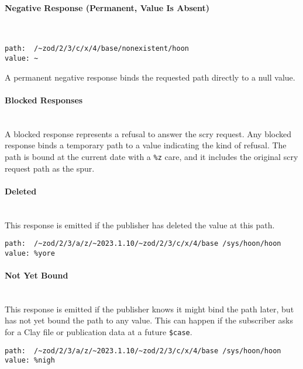 \documentclass[twoside]{article}
\begin{document}
\paragraph{Negative Response (Permanent, Value Is Absent)} \mbox{}\\

\begin{lstlisting}[style=listingcode]
path:  /~zod/2/3/c/x/4/base/nonexistent/hoon
value: ~
\end{lstlisting}

A permanent negative response binds the requested path directly to a null value.

\paragraph{Blocked Responses} \mbox{}\\

A blocked response represents a refusal to answer the scry request. Any blocked response binds a temporary path to a value indicating the kind of refusal. The path is bound at the current date with a \lstinline[style=inlinecode]{%z} care, and it includes the original scry request path as the spur.

\paragraph{Deleted} \mbox{}\\

This response is emitted if the publisher has deleted the value at this path.

\begin{lstlisting}[style=listingcode]
path:  /~zod/2/3/a/z/~2023.1.10/~zod/2/3/c/x/4/base /sys/hoon/hoon
value: %yore
\end{lstlisting}

\paragraph{Not Yet Bound} \mbox{}\\

This response is emitted if the publisher knows it might bind the path later, but has not yet bound the path to any value. This can happen if the subscriber asks for a Clay file or publication data at a future \lstinline[style=inlinecode]{$case}.

\begin{lstlisting}[style=listingcode]
path:  /~zod/2/3/a/z/~2023.1.10/~zod/2/3/c/x/4/base /sys/hoon/hoon
value: %nigh
\end{lstlisting}
\end{document}
